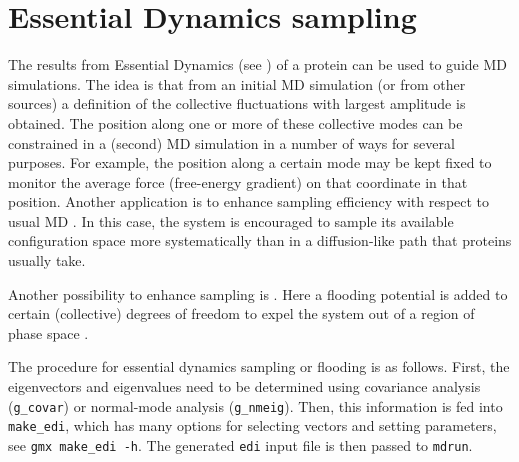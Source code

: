 
\section{Essential Dynamics sampling}
The results from Essential Dynamics (see )
of a protein can be used to guide MD simulations. The idea is that
from an initial MD simulation (or from other sources) a definition of
the collective fluctuations with largest amplitude is obtained. The
position along one or more of these collective modes can be
constrained in a (second) MD simulation in a number of ways for
several purposes. For example, the position along a certain mode may
be kept fixed to monitor the average force (free-energy gradient) on
that coordinate in that position. Another application is to enhance
sampling efficiency with respect to usual MD
\cite{Degroot96a,Degroot96b}. In this case, the system is encouraged
to sample its available configuration space more systematically than
in a diffusion-like path that proteins usually take.

Another possibility to enhance sampling is .
Here a flooding potential is added to certain
(collective) degrees of freedom to expel the system out
of a region of phase space \cite{Lange2006a}.

The procedure for essential dynamics sampling or flooding is as follows.
First, the eigenvectors and eigenvalues need to be determined
using covariance analysis ({\tt g_covar})
or normal-mode analysis ({\tt g_nmeig}).
Then, this information is fed into {\tt make_edi},
which has many options for selecting vectors and setting parameters,
see {\tt gmx make_edi -h}.
The generated {\tt edi} input file is then passed to {\tt mdrun}.


\section{}

